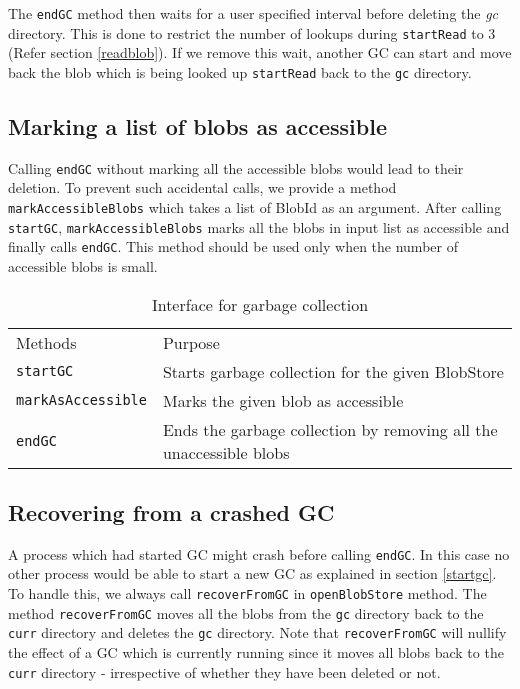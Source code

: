 The \texttt{endGC} method then waits for a user specified interval before deleting the \textit{gc} directory. This is done to restrict the number of lookups during \texttt{startRead} to 3 (Refer section \ref{readblob}). If we remove this wait, another GC can start and move back the blob which is being looked up \texttt{startRead} back to the \texttt{gc} directory.

\subsection{Marking a list of blobs as accessible}
Calling \texttt{endGC} without marking all the accessible blobs would lead to their deletion. To prevent such accidental calls, we provide a method \texttt{markAccessibleBlobs} which takes a list of BlobId as an argument. After calling \texttt{startGC}, \texttt{markAccessibleBlobs} marks all the blobs in input list as accessible and finally calls \texttt{endGC}.
This method should be used only when the number of accessible blobs is small.

\begin{table}[hbt]
\caption{Interface for garbage collection}
\label{tab:interface-gc}
\begin{center}
  \begin{tabularx}{0.91\textwidth}{lX}
    \hline\noalign{\smallskip}
    Methods & Purpose \\
    \noalign{\smallskip}
    \hline
    \noalign{\smallskip}
    \texttt{startGC} & Starts garbage collection for the given BlobStore\\
    \texttt{markAsAccessible} & Marks the given blob as accessible\\
    \texttt{endGC} & Ends the garbage collection by removing all the unaccessible blobs\\
    \hline
  \end{tabularx}
\end{center}
\end{table}

\subsection{Recovering from a crashed GC} \label{recovercrashedgc}
A process which had started GC might crash before calling \texttt{endGC}. In this case no other process would be able to start a new GC as explained in section \ref{startgc}.
To handle this, we always call \texttt{recoverFromGC} in \texttt{openBlobStore} method. The method \texttt{recoverFromGC} moves all the blobs from the \texttt{gc} directory back to the \texttt{curr} directory and deletes the \texttt{gc} directory.
Note that \texttt{recoverFromGC} will nullify the effect of a GC which is currently running since it moves all blobs back to the \texttt{curr} directory - irrespective of whether they have been deleted or not.
